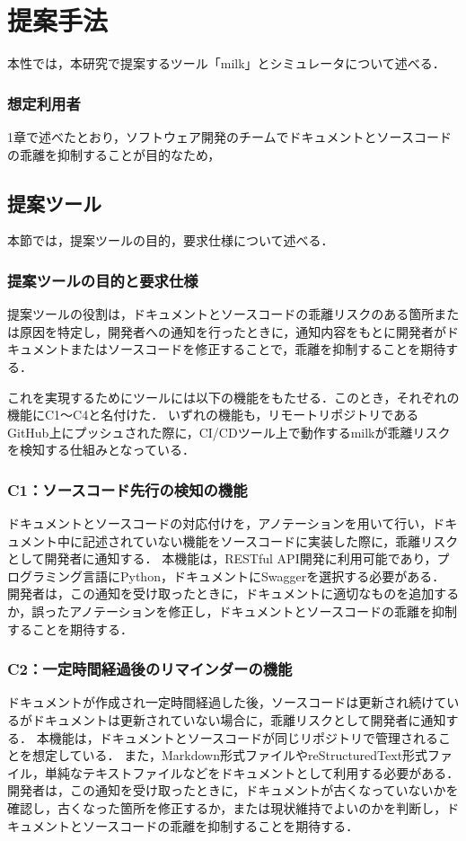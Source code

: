 \chapter{提案手法}
本性では，本研究で提案するツール「milk」とシミュレータについて述べる．

\subsection{想定利用者}
1章で述べたとおり，ソフトウェア開発のチームでドキュメントとソースコードの乖離を抑制することが目的なため，

\section{提案ツール}
本節では，提案ツールの目的，要求仕様について述べる．

\subsection{提案ツールの目的と要求仕様}
提案ツールの役割は，ドキュメントとソースコードの乖離リスクのある箇所または原因を特定し，開発者への通知を行ったときに，通知内容をもとに開発者がドキュメントまたはソースコードを修正することで，乖離を抑制することを期待する．

これを実現するためにツールには以下の機能をもたせる．このとき，それぞれの機能にC1〜C4と名付けた．
いずれの機能も，リモートリポジトリであるGitHub上にプッシュされた際に，CI/CDツール上で動作するmilkが乖離リスクを検知する仕組みとなっている．

\subsection{C1：ソースコード先行の検知の機能}
ドキュメントとソースコードの対応付けを，アノテーションを用いて行い，ドキュメント中に記述されていない機能をソースコードに実装した際に，乖離リスクとして開発者に通知する．
本機能は，RESTful API開発に利用可能であり，プログラミング言語にPython，ドキュメントにSwaggerを選択する必要がある．
開発者は，この通知を受け取ったときに，ドキュメントに適切なものを追加するか，誤ったアノテーションを修正し，ドキュメントとソースコードの乖離を抑制することを期待する．

\subsection{C2：一定時間経過後のリマインダーの機能}
ドキュメントが作成され一定時間経過した後，ソースコードは更新され続けているがドキュメントは更新されていない場合に，乖離リスクとして開発者に通知する．
本機能は，ドキュメントとソースコードが同じリポジトリで管理されることを想定している．
また，Markdown形式ファイルやreStructuredText形式ファイル，単純なテキストファイルなどをドキュメントとして利用する必要がある．
開発者は，この通知を受け取ったときに，ドキュメントが古くなっていないかを確認し，古くなった箇所を修正するか，または現状維持でよいのかを判断し，ドキュメントとソースコードの乖離を抑制することを期待する．

